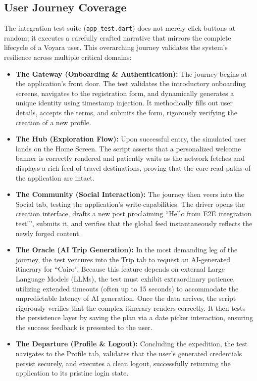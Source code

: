 \subsection{User Journey Coverage}
The integration test suite (\texttt{app\_test.dart}) does not merely click buttons at random; it executes a carefully crafted narrative that mirrors the complete lifecycle of a Voyara user. This overarching journey validates the system's resilience across multiple critical domains:
\begin{itemize}
    \item \textbf{The Gateway (Onboarding \& Authentication):} The journey begins at the application's front door. The test validates the introductory onboarding screens, navigates to the registration form, and dynamically generates a unique identity using timestamp injection. It methodically fills out user details, accepts the terms, and submits the form, rigorously verifying the creation of a new profile.
    \item \textbf{The Hub (Exploration Flow):} Upon successful entry, the simulated user lands on the Home Screen. The script asserts that a personalized welcome banner is correctly rendered and patiently waits as the network fetches and displays a rich feed of travel destinations, proving that the core read-paths of the application are intact.
    \item \textbf{The Community (Social Interaction):} The journey then veers into the Social tab, testing the application's write-capabilities. The driver opens the creation interface, drafts a new post proclaiming ``Hello from E2E integration test!'', submits it, and verifies that the global feed instantaneously reflects the newly forged content.
    \item \textbf{The Oracle (AI Trip Generation):} In the most demanding leg of the journey, the test ventures into the Trip tab to request an AI-generated itinerary for ``Cairo''. Because this feature depends on external Large Language Models (LLMs), the test must exhibit extraordinary patience, utilizing extended timeouts (often up to 15 seconds) to accommodate the unpredictable latency of AI generation. Once the data arrives, the script rigorously verifies that the complex itinerary renders correctly. It then tests the persistence layer by saving the plan via a date picker interaction, ensuring the success feedback is presented to the user.
    \item \textbf{The Departure (Profile \& Logout):} Concluding the expedition, the test navigates to the Profile tab, validates that the user's generated credentials persist securely, and executes a clean logout, successfully returning the application to its pristine login state.
\end{itemize}

